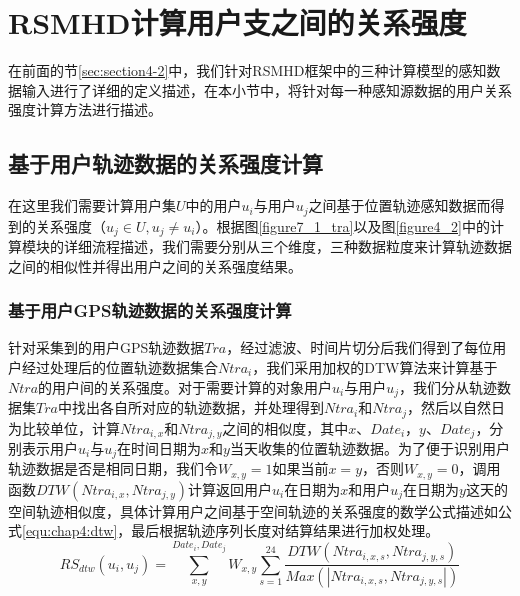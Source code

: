 \section{RSMHD计算用户支之间的关系强度}
\label{sec:section4-3}
在前面的节\ref{sec:section4-2}中，我们针对RSMHD框架中的三种计算模型的感知数据输入进行了详细的定义描述，在本小节中，将针对每一种感知源数据的用户关系强度计算方法进行描述。
\subsection{基于用户轨迹数据的关系强度计算}
\label{sec:tra_relation}
在这里我们需要计算用户集$U$中的用户$u_{i}$与用户$u_{j}$之间基于位置轨迹感知数据而得到的关系强度（$u_{j} \in U,u_{j} \neq u_{i}$）。根据图\ref{figure7_1_tra}以及图\ref{figure4_2}中的计算模块的详细流程描述，我们需要分别从三个维度，三种数据粒度来计算轨迹数据之间的相似性并得出用户之间的关系强度结果。
\subsubsection{基于用户GPS轨迹数据的关系强度计算}
针对采集到的用户GPS轨迹数据$Tra$，经过滤波、时间片切分后我们得到了每位用户经过处理后的位置轨迹数据集合$Ntra_{i}$，我们采用加权的DTW算法来计算基于$Ntra$的用户间的关系强度。对于需要计算的对象用户$u_{i}$与用户$u_{j}$，我们分从轨迹数据集$Tra$中找出各自所对应的轨迹数据，并处理得到$Ntra_{i}$和$Ntra_{j}$，然后以自然日为比较单位，计算$Ntra_{i,x}$和$Ntra_{j,y}$之间的相似度，其中$x 、 Date_{i}$，$y 、 Date_{j}$，分别表示用户$u_{i}$与$u_{j}$在时间日期为$x$和$y$当天收集的位置轨迹数据。为了便于识别用户轨迹数据是否是相同日期，我们令$W_{x,y}=1$如果当前$x=y$，否则$W_{x,y}=0$，调用函数$DTW(Ntra_{i,x},Ntra_{j,y})$计算返回用户$u_{i}$在日期为$x$和用户$u_{j}$在日期为$y$这天的空间轨迹相似度，具体计算用户之间基于空间轨迹的关系强度的数学公式描述如公式\ref{equ:chap4:dtw}，最后根据轨迹序列长度对结算结果进行加权处理。
\begin{equation}
\label{equ:chap4:dtw}
RS_{dtw}(u_{i},u_{j})=\sum_{x ,y }^{ Date_{i}, Date_{j}}W_{x,y}\sum_{s=1}^{24} \frac{DTW(Ntra_{i,x,s},Ntra_{j,y,s})}{Max(\left | Ntra_{i,x,s},Ntra_{j,y,s}  \right |)}
\end{equation}
